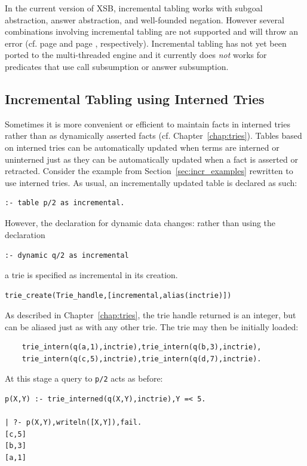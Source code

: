 In the current version of XSB, incremental tabling works with subgoal
abstraction, answer abstraction, and well-founded negation.  However
several combinations involving incremental tabling are not supported
and will throw an error (cf. page \pageref{table-declaration} and page
\pageref{dynamic-declaration}, respectively). Incremental tabling has
not yet been ported to the multi-threaded engine and it currently does
{\em not} works for predicates that use call subsumption or answer
subsumption.

\subsection{Incremental Tabling using Interned Tries} \label{sec:incr-update-tries}
%
Sometimes it is more convenient or efficient to maintain facts in
interned tries rather than as dynamically asserted facts
(cf. Chapter~\ref{chap:tries}).  Tables based on interned tries can be
automatically updated when terms are interned or uninterned just as
they can be automatically updated when a fact is asserted or
retracted.  Consider the example from Section~\ref{sec:incr_examples}
rewritten to use interned tries.  As usual, an incrementally updated
table is declared as such:
%
\begin{verbatim}
:- table p/2 as incremental.
\end{verbatim}
%
However, the declaration for dynamic data changes: rather than using
the declaration 
\begin{center}
{\tt :- dynamic q/2 as incremental}
\end{center}
a trie is specified as incremental in its creation.
%
\begin{center}
{\tt  trie\_create(Trie\_handle,[incremental,alias(inctrie)])}
\end{center}
%
As described in Chapter~\ref{chap:tries}, the trie handle returned is
an integer, but can be aliased just as with any other trie.  The trie
may then be initially loaded:
%
\begin{verbatim}
	trie_intern(q(a,1),inctrie),trie_intern(q(b,3),inctrie),
	trie_intern(q(c,5),inctrie),trie_intern(q(d,7),inctrie).
\end{verbatim}
%
At this stage a query to {\tt p/2} acts as before:
%
\begin{verbatim}
p(X,Y) :- trie_interned(q(X,Y),inctrie),Y =< 5.

| ?- p(X,Y),writeln([X,Y]),fail.
[c,5]
[b,3]
[a,1]
\end{verbatim}
